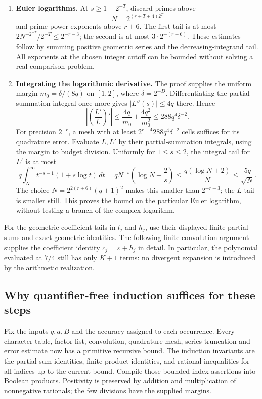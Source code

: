 \begin{enumerate}
\item \textbf{Euler logarithms.} At $s\geq1+2^{-T}$, discard primes above
\[
 N=2^{(r+T+4)2^T}
\]
and prime-power exponents above $r+6$. The first tail is at most
$2N^{-2^{-T}}/2^{-T}\leq2^{-r-3}$; the second is at most $3\cdot2^{-(r+6)}$. These estimates follow by summing positive geometric series and the decreasing-integrand tail. All exponents at the chosen integer cutoff can be bounded without solving a real comparison problem.

\item \textbf{Integrating the logarithmic derivative.} The proof supplies the uniform margin $m_0=\delta/(8q)$ on $[1,2]$, where $\delta=2^{-D}$. Differentiating the partial-summation integral once more gives $|L''(s)|\leq4q$ there. Hence
\[
 \left|\left(\frac{L'}L\right)'\right|
 \leq \frac{4q}{m_0}+\frac{4q^2}{m_0^2}
 \leq288q^4\delta^{-2}.
\]
For precision $2^{-r}$, a mesh with at least $2^{r+4}288q^4\delta^{-2}$ cells suffices for its quadrature error. Evaluate $L,L'$ by their partial-summation integrals, using the margin to budget division. Uniformly for $1\leq s\leq2$, the integral tail for $L'$ is at most
\[
 q\int_N^\infty t^{-s-1}(1+s\log t)\,dt
 =qN^{-s}\left(\log N+\frac2s\right)
 \leq\frac{q(\log N+2)}{N}\leq\frac{5q}{\sqrt N}.
\]
The choice $N=2^{2(r+6)}(q+1)^2$ makes this smaller than $2^{-r-3}$; the $L$ tail is smaller still. This proves the bound on the particular Euler logarithm, without testing a branch of the complex logarithm.
\end{enumerate}

For the geometric coefficient tails in $l_j$ and $h_j$, use their displayed finite partial sums and exact geometric identities. The following finite convolution argument supplies the coefficient identity $c_j=\varepsilon+h_j$ in detail. In particular, the polynomial evaluated at $7/4$ still has only $K+1$ terms: no divergent expansion is introduced by the arithmetic realization.



\subsection{Why quantifier-free induction suffices for these steps}

Fix the inputs $q,a,B$ and the accuracy assigned to each occurrence. Every character table, factor list, convolution, quadrature mesh, series truncation and error estimate now has a primitive recursive bound. The induction invariants are the partial-sum identities, finite product identities, and rational inequalities for all indices up to the current bound. Compile those bounded index assertions into Boolean products. Positivity is preserved by addition and multiplication of nonnegative rationals; the few divisions have the supplied margins.

